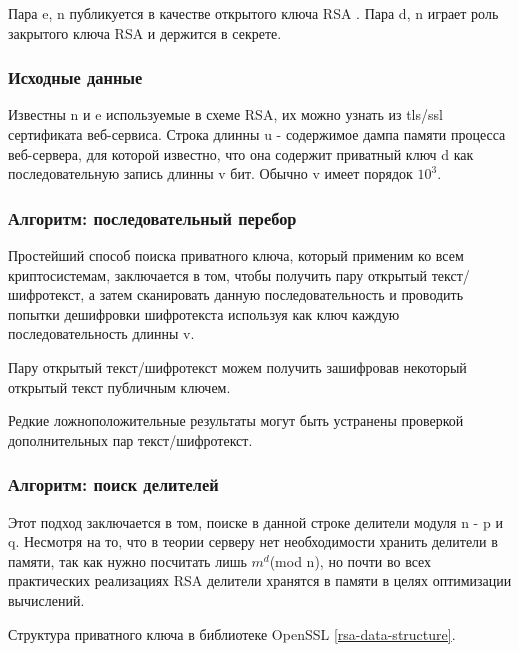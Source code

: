 \documentclass[20pt]{article}
\begin{document}
Пара {e, n} публикуется в качестве открытого ключа RSA .
Пара {d, n} играет роль закрытого ключа RSA и держится в секрете.

\subsubsection{Исходные данные}

Известны n и e используемые в схеме RSA, их можно узнать из tls/ssl сертификата
веб-сервиса. Строка длинны u - содержимое дампа памяти процесса веб-сервера, для
которой известно, что она содержит приватный ключ d как последовательную запись
длинны v бит. Обычно v имеет порядок $10^3$.

\subsubsection{Алгоритм: последовательный перебор}

Простейший способ поиска приватного ключа, который применим ко всем
криптосистемам, заключается в том, чтобы получить пару открытый текст/шифротекст,
а затем сканировать данную последовательность и проводить попытки дешифровки
шифротекста используя как ключ каждую последовательность длинны v.

Пару открытый текст/шифротекст можем получить зашифровав некоторый открытый текст
публичным ключем.

Редкие ложноположительные результаты могут быть устранены проверкой
дополнительных пар текст/шифротекст.

\subsubsection{Алгоритм: поиск делителей}

Этот подход заключается в том, поиске в данной строке делители модуля n - p и q.
Несмотря на то, что в теории серверу нет необходимости хранить делители в
памяти, так как нужно посчитать лишь $m^d$(mod n), но почти во всех практических
реализациях RSA делители хранятся в памяти в целях оптимизации вычислений.

Структура приватного ключа в библиотеке OpenSSL \ref{rsa-data-structure}.
\end{document}
